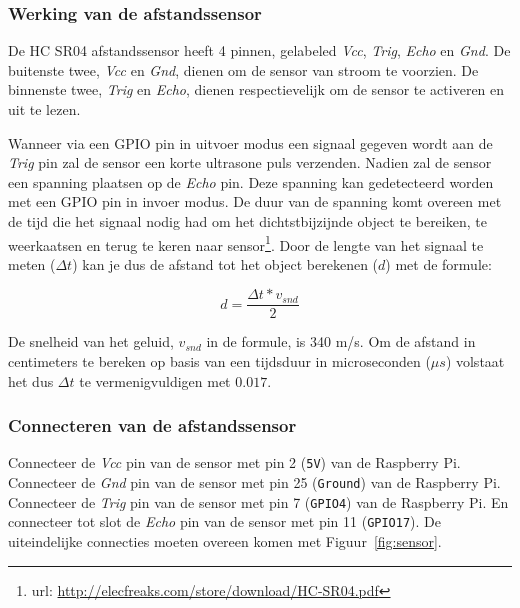 \documentclass[a4paper]{article}
\begin{document}
    \subsubsection{Werking van de afstandssensor}

      De HC SR04 afstandssensor heeft 4 pinnen, gelabeled \emph{Vcc},
\emph{Trig}, \emph{Echo} en \emph{Gnd}.  De buitenste twee, \emph{Vcc}
en \emph{Gnd}, dienen om de sensor van stroom te voorzien.  De
binnenste twee, \emph{Trig} en \emph{Echo}, dienen respectievelijk om
de sensor te activeren en uit te lezen.

      Wanneer via een GPIO pin in uitvoer modus een signaal gegeven
wordt aan de \emph{Trig} pin zal de sensor een korte ultrasone puls
verzenden.  Nadien zal de sensor een spanning plaatsen op de
\emph{Echo} pin.  Deze spanning kan gedetecteerd worden met een GPIO
pin in invoer modus.  De duur van de spanning komt overeen met de tijd
die het signaal nodig had om het dichtstbijzijnde object te bereiken,
te weerkaatsen en terug te keren naar
sensor\footnote{url: \url{http://elecfreaks.com/store/download/HC-SR04.pdf}}.
Door de lengte van het signaal te meten ($\Delta t$) kan je dus de afstand tot het
object berekenen ($d$) met de formule:

    \begin{equation}
      d = \frac{\Delta t * v_{snd}}{2}
    \end{equation}

      De snelheid van het geluid, $v_{snd}$ in de formule, is 340 m/s.
Om de afstand in centimeters te bereken op basis van een tijdsduur in
microseconden ($\mu s$) volstaat het dus $\Delta t$ te
vermenigvuldigen met $0.017$.

    \subsubsection{Connecteren van de afstandssensor}

      Connecteer de \emph{Vcc} pin van de sensor met pin 2
(\texttt{5V}) van de
Raspberry Pi.  Connecteer de \emph{Gnd} pin van de sensor met pin 25
(\texttt{Ground}) van de Raspberry Pi.  Connecteer de \emph{Trig} pin van de
sensor met pin 7 (\texttt{GPIO4}) van de Raspberry Pi.  En connecteer tot
slot de \emph{Echo} pin van de sensor met pin 11 (\texttt{GPIO17}).
De uiteindelijke connecties moeten overeen komen met
Figuur~\ref{fig:sensor}.
\end{document}
